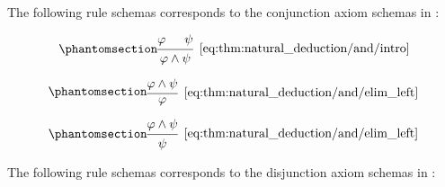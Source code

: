 \begin{proposition}
\begin{thmenum}
     The following rule schemas corresponds to the conjunction axiom schemas in :

    \begin{minipage}{0.3\textwidth}
      \begin{equation*}\taglabel[\textrm{R} \( \wedge^+ \)]{eq:thm:natural_deduction/and/intro}
        \begin{prooftree}
          \hypo{ \varphi }
          \hypo{ \psi }
          \infer2[\ref{eq:thm:natural_deduction/and/intro}]{ \varphi \wedge \psi }
        \end{prooftree}
      \end{equation*}
    \end{minipage}
    \hfill
    \begin{minipage}{0.3\textwidth}
      \begin{equation*}\taglabel[\textrm{R} \( \wedge_L^- \)]{eq:thm:natural_deduction/and/elim_left}
        \begin{prooftree}
          \hypo{ \varphi \wedge \psi }
          \infer1[\ref{eq:thm:natural_deduction/and/elim_left}]{ \varphi }
        \end{prooftree}
      \end{equation*}
    \end{minipage}
    \hfill
    \begin{minipage}{0.3\textwidth}
      \begin{equation*}\taglabel[\textrm{R} \( \wedge_R^- \)]{eq:thm:natural_deduction/and/elim_right}
        \begin{prooftree}
          \hypo{ \varphi \wedge \psi }
          \infer1[\ref{eq:thm:natural_deduction/and/elim_left}]{ \psi }
        \end{prooftree}
      \end{equation*}
    \end{minipage}

     The following rule schemas corresponds to the disjunction axiom schemas in :


\end{thmenum}
\end{proposition}
